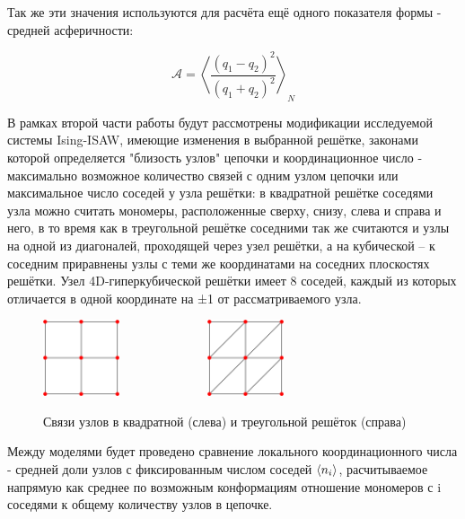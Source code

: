 Так же эти значения используются для расчёта ещё одного показателя формы - 
средней асферичности:

\begin{equation}
\label{eq:Asphericity}
    \mathcal{A} = \left\langle \frac{(q_{1} - q_{2})^{2}}{(q_{1} + q_{2})^{2}} \right\rangle_{N}
\end{equation}

В рамках второй части работы будут рассмотрены модификации исследуемой системы Ising-ISAW, имеющие изменения в выбранной решётке, законами которой определяется "близость узлов" цепочки и координационное число - максимально возможное количество связей с одним узлом цепочки или максимальное число соседей у узла решётки:
в квадратной решётке соседями узла можно считать мономеры, расположенные сверху, снизу, слева и справа и него, 
в то время как в треугольной решётке соседними так же считаются и узлы на одной из диагоналей, проходящей через узел решётки,
а на кубической – к соседним приравнены узлы с теми же координатами на соседних плоскостях решётки.
Узел 4D-гиперкубической решётки имеет 8 соседей, каждый из которых отличается в одной координате на ±1 от рассматриваемого узла.

\begin{figure}[h]
    \centering
    \includegraphics[width=0.2\textwidth]{Sections/Images/SqLattice.png}\ \ \ \ \ \ \ \ \ \ \ \ \ \ 
    \includegraphics[width=0.2\textwidth]{Sections/Images/TriLattice.png}
    \caption{Связи узлов в квадратной (слева) и треугольной решёток (справа)}
    \label{fig:lattices}
\end{figure}

Между моделями будет проведено сравнение локального координационного числа - средней доли узлов с фиксированным числом соседей $\langle n_i \rangle$, расчитываемое напрямую как среднее по возможным конформациям отношение мономеров с i соседями к общему количеству узлов в цепочке.

